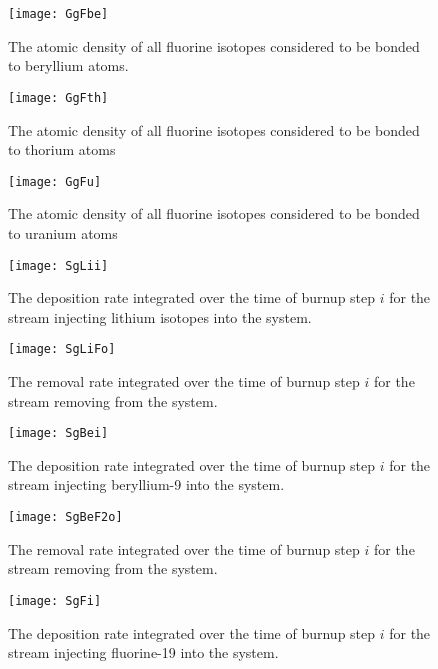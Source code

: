 \begin{figure}[H]
    \centering
    \texttt{[image: GgFbe]}
    \caption{The atomic density of all fluorine isotopes considered to be bonded
    to beryllium atoms.}
    \label{fig:GgFbe}
\end{figure}

\begin{figure}[H]
    \centering
    \texttt{[image: GgFth]}
    \caption{The atomic density of all fluorine isotopes considered to be bonded
    to thorium atoms}
    \label{fig:GgFth}
\end{figure}

\begin{figure}[H]
    \centering
    \texttt{[image: GgFu]}
    \caption{The atomic density of all fluorine isotopes considered to be bonded
    to uranium atoms}
    \label{fig:GgFu}
\end{figure}

\begin{figure}[H]
    \centering
    \texttt{[image: SgLii]}
    \caption{The deposition rate integrated over the time of burnup step $i$
    for the stream injecting lithium isotopes into the system.}
    \label{fig:SgLii}
\end{figure}

\begin{figure}[H]
    \centering
    \texttt{[image: SgLiFo]}
    \caption{The removal rate integrated over the time of burnup step $i$
    for the stream removing  from the system.}
    \label{fig:SgLiFo}
\end{figure}

\begin{figure}[H]
    \centering
    \texttt{[image: SgBei]}
    \caption{The deposition rate integrated over the time of burnup step $i$
    for the stream injecting beryllium-9 into the system.}
    \label{fig:SgBei}
\end{figure}

\begin{figure}[H]
    \centering
    \texttt{[image: SgBeF2o]}
    \caption{The removal rate integrated over the time of burnup step $i$
    for the stream removing  from the system.}
    \label{fig:SgBeF2o}
\end{figure}

\begin{figure}[H]
    \centering
    \texttt{[image: SgFi]}
    \caption{The deposition rate integrated over the time of burnup step $i$
    for the stream injecting fluorine-19 into the system.}
    \label{fig:SgFi}
\end{figure}

